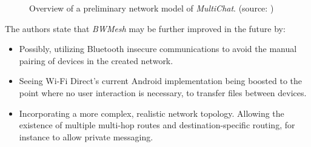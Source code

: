 \begin{figure}[ht]
	\noindent{}
	\caption{\label{fig:bwmeshnet} Overview of a preliminary network model of \textit{MultiChat}. (source: \cite{bwmesh})}
\end{figure}

The authors state that \textit{BWMesh} may be further improved in the future by:

\begin{itemize}
	\item Possibly, utilizing Bluetooth insecure communications to avoid the manual pairing of devices in the created network.
	\item Seeing Wi-Fi Direct's current Android implementation being boosted to the point where no user interaction is necessary, to transfer files between devices.
	\item Incorporating a more complex, realistic network topology. Allowing the existence of multiple multi-hop routes and destination-specific routing, for instance to allow private messaging.
\end{itemize}


